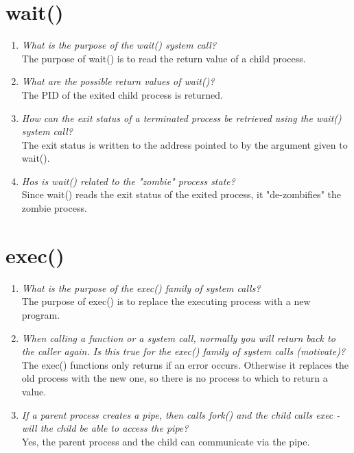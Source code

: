 \documentclass[a4paper]{article}
\begin{document}
\section{wait()}
\begin{enumerate}
  \item \textit{What is the purpose of the wait() system call?} \\
    The purpose of wait() is to read the return value of a child process.
  \item \textit{What are the possible return values of wait()?} \\
    The PID of the exited child process is returned.
  \item \textit{How can the exit status of a terminated process be retrieved using the wait() system call?} \\
    The exit status is written to the address pointed to by the argument given to wait().
  \item \textit{Hos is wait() related to the  "zombie" process state?} \\
    Since wait() reads the exit status of the exited process, it "de-zombifies" the zombie process.
\end{enumerate}

\section{exec()}
\begin{enumerate}
  \item \textit{What is the purpose of the exec() family of system calls?} \\
    The purpose of exec() is to replace the executing process with a new program.
  \item \textit{When calling a function or a system call, normally you will return back to the caller again. Is this true for the exec() family of system calls (motivate)?} \\
    The exec() functions only returns if an error occurs. Otherwise it replaces the old process with the new one, so there is no process to which to return a value.
  \item \textit{If a parent process creates a pipe, then calls fork() and the child calls exec - will the child be able to access the pipe?} \\
    Yes, the parent process and the child can communicate via the pipe.

\end{enumerate}
\end{document}
